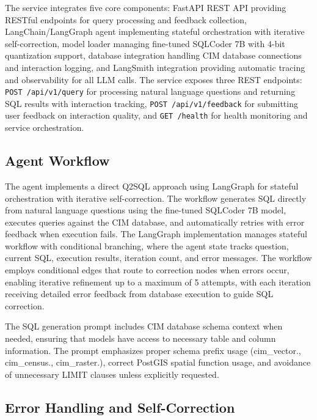 The service integrates five core components: FastAPI REST API providing RESTful endpoints for query processing and feedback collection, LangChain/LangGraph agent implementing stateful orchestration with iterative self-correction, model loader managing fine-tuned SQLCoder 7B with 4-bit quantization support, database integration handling CIM database connections and interaction logging, and LangSmith integration providing automatic tracing and observability for all LLM calls. The service exposes three REST endpoints: \texttt{POST /api/v1/query} for processing natural language questions and returning SQL results with interaction tracking, \texttt{POST /api/v1/feedback} for submitting user feedback on interaction quality, and \texttt{GET /health} for health monitoring and service orchestration.

\subsection{Agent Workflow}

The agent implements a direct Q2SQL approach using LangGraph for stateful orchestration with iterative self-correction. The workflow generates SQL directly from natural language questions using the fine-tuned SQLCoder 7B model, executes queries against the CIM database, and automatically retries with error feedback when execution fails. The LangGraph implementation manages stateful workflow with conditional branching, where the agent state tracks question, current SQL, execution results, iteration count, and error messages. The workflow employs conditional edges that route to correction nodes when errors occur, enabling iterative refinement up to a maximum of 5 attempts, with each iteration receiving detailed error feedback from database execution to guide SQL correction.

The SQL generation prompt includes CIM database schema context when needed, ensuring that models have access to necessary table and column information. The prompt emphasizes proper schema prefix usage (cim\_vector., cim\_census., cim\_raster.), correct PostGIS spatial function usage, and avoidance of unnecessary LIMIT clauses unless explicitly requested.

\subsection{Error Handling and Self-Correction}

